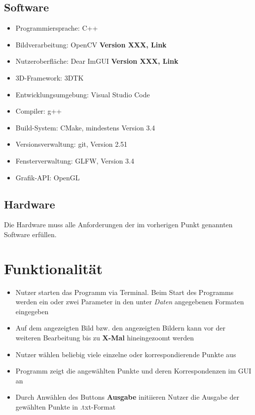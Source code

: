 \documentclass[a4paper,10pt]{scrartcl}
\begin{document}
\subsection{Software}

\begin{itemize}
	\item Programmiersprache: C++
	\item Bildverarbeitung: OpenCV \textbf{Version XXX, Link}
	\item Nutzeroberfläche: Dear ImGUI \textbf{Version XXX, Link}
	\item 3D-Framework: 3DTK
	\item Entwicklungsumgebung: Visual Studio Code
	\item Compiler: g++
	\item Build-System: CMake, mindestens Version 3.4
	\item Versionsverwaltung: git, Version 2.51
	\item Fensterverwaltung: GLFW, Version 3.4
	\item Grafik-API: OpenGL
\end{itemize}

\subsection{Hardware}

Die Hardware muss alle Anforderungen der im vorherigen Punkt genannten Software erfüllen.

\section{Funktionalität}

\begin{itemize}
	\item Nutzer starten das Programm via Terminal. Beim Start des Programms werden ein oder zwei Parameter in den unter \textit{Daten} angegebenen Formaten eingegeben
	\item Auf dem angezeigten Bild bzw. den angezeigten Bildern kann vor der weiteren Bearbeitung bis zu \textbf{X-Mal} hineingezoomt werden
	\item Nutzer wählen beliebig viele einzelne oder korrespondierende Punkte aus
	\item Programm zeigt die angewählten Punkte und deren Korrespondenzen im GUI an
	\item Durch Anwählen des Buttons \textbf{Ausgabe} initiieren Nutzer die Ausgabe der gewählten Punkte in .txt-Format
\end{itemize}
\end{document}
